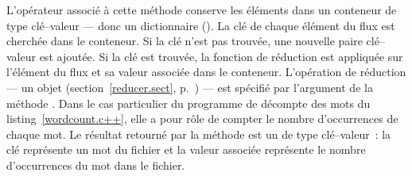 L'opérateur  associ\'e \`a cette m\'ethode conserve les \'el\'ements dans un conteneur de type cl\'e--valeur --- donc un dictionnaire (). La cl\'e de chaque \'el\'ement du flux est cherch\'ee dans le conteneur. Si la cl\'e n'est pas trouv\'ee, une nouvelle paire cl\'e--valeur est ajout\'ee. Si la cl\'e est trouv\'ee, la fonction de r\'eduction est appliqu\'ee sur l'\'el\'ement du flux et sa valeur associ\'ee dans le conteneur. L'op\'eration de r\'eduction --- un objet  (section~\ref{reducer.sect}, p.~\pageref{reducer.sect})  --- est sp\'ecifi\'e par l'argument de la m\'ethode . Dans le cas particulier du programme de d\'ecompte des mots du listing~\ref{wordcount.c++}, elle a pour r\^ole de compter le nombre d'occurrences de chaque mot. Le r\'esultat retourn\'e par la m\'ethode  est un  de type cl\'e--valeur~: la cl\'e repr\'esente un mot du fichier et la valeur associ\'ee repr\'esente le nombre d'occurrences du mot dans le fichier.



